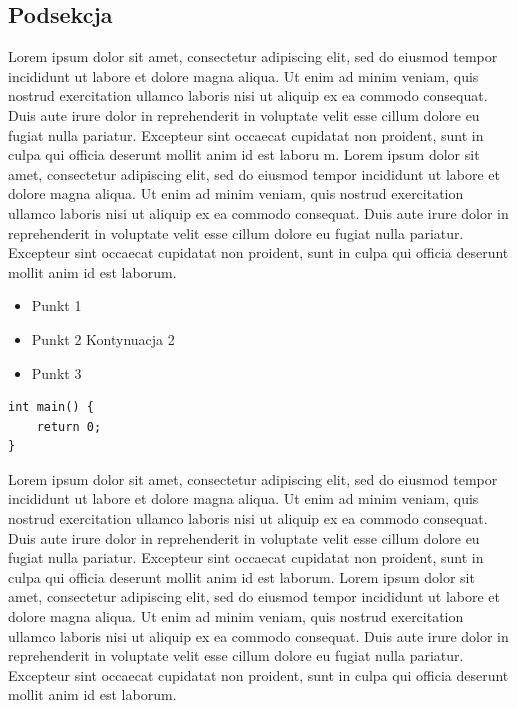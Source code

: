 \documentclass{article}
\begin{document}
\subsection{Podsekcja}
Lorem ipsum dolor sit amet, consectetur adipiscing elit, sed do eiusmod tempor incididunt ut labore et dolore magna aliqua. Ut enim ad minim veniam, quis nostrud exercitation ullamco laboris nisi ut aliquip ex ea commodo consequat. Duis aute irure dolor in reprehenderit in voluptate velit esse cillum dolore eu fugiat nulla pariatur. Excepteur sint occaecat cupidatat non proident, sunt in culpa qui officia deserunt mollit anim id est laboru m. Lorem ipsum dolor sit amet, consectetur adipiscing elit, sed do eiusmod tempor incididunt ut labore et dolore magna aliqua. Ut enim ad minim veniam, quis nostrud exercitation ullamco laboris nisi ut aliquip ex ea commodo consequat. Duis aute irure dolor in reprehenderit in voluptate velit esse cillum dolore eu fugiat nulla pariatur. Excepteur sint occaecat cupidatat non proident, sunt in culpa qui officia deserunt mollit anim id est laborum. 
\begin{itemize}
\item Punkt 1 
\item Punkt 2 Kontynuacja 2 
\item Punkt 3 
\end{itemize}
\begin{lstlisting}
int main() { 
	return 0; 
} \end{lstlisting}Lorem ipsum dolor sit amet, consectetur adipiscing elit, sed do eiusmod tempor incididunt ut labore et dolore magna aliqua. Ut enim ad minim veniam, quis nostrud exercitation ullamco laboris nisi ut aliquip ex ea commodo consequat. Duis aute irure dolor in reprehenderit in voluptate velit esse cillum dolore eu fugiat nulla pariatur. Excepteur sint occaecat cupidatat non proident, sunt in culpa qui officia deserunt mollit anim id est laborum. 
Lorem ipsum dolor sit amet, consectetur adipiscing elit, sed do eiusmod tempor incididunt ut labore et dolore magna aliqua. Ut enim ad minim veniam, quis nostrud exercitation ullamco laboris nisi ut aliquip ex ea commodo consequat. Duis aute irure dolor in reprehenderit in voluptate velit esse cillum dolore eu fugiat nulla pariatur. Excepteur sint occaecat cupidatat non proident, sunt in culpa qui officia deserunt mollit anim id est laborum. 
\end{document}
